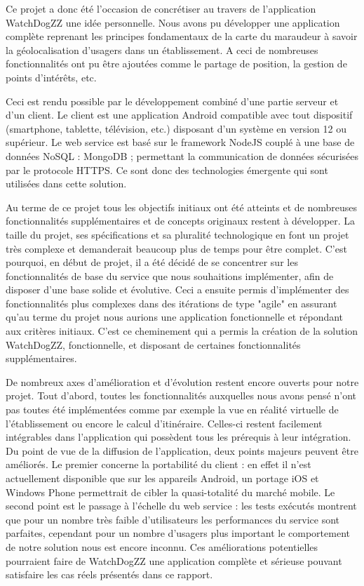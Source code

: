 
Ce projet a donc été l’occasion de concrétiser au travers de l’application WatchDogZZ une idée personnelle. Nous avons pu développer une application complète reprenant les principes fondamentaux de la carte du maraudeur à savoir la géolocalisation d’usagers dans un établissement. A ceci de nombreuses fonctionnalités ont pu être ajoutées comme le partage de position, la gestion de points d’intérêts, etc.

Ceci est rendu possible par le développement combiné d'une partie serveur et d'un client. Le client est une application Android compatible avec tout dispositif (smartphone, tablette, télévision, etc.) disposant d’un système en version 12 ou supérieur. Le web service est basé sur le framework NodeJS couplé à une base de données NoSQL : MongoDB ; permettant la communication de données sécurisées par le protocole HTTPS. Ce sont donc des technologies émergente qui sont utilisées dans cette solution.

Au terme de ce projet tous les objectifs initiaux ont été atteints et de nombreuses fonctionnalités supplémentaires et de concepts originaux restent à développer. La taille du projet, ses spécifications et sa pluralité technologique en font un projet très complexe et demanderait beaucoup plus de temps pour être complet.
C'est pourquoi, en début de projet, il a été décidé de se concentrer sur les fonctionnalités de base du service que nous souhaitions implémenter, afin de disposer d'une base solide et évolutive.
Ceci a ensuite permis d’implémenter des fonctionnalités plus complexes dans des itérations de type "agile" en assurant qu’au terme du projet nous aurions une application fonctionnelle et répondant aux critères initiaux.
C'est ce cheminement qui a permis la création de la solution WatchDogZZ, fonctionnelle, et disposant de certaines fonctionnalités supplémentaires.

De nombreux axes d’amélioration et d’évolution restent encore ouverts pour notre projet. Tout d’abord, toutes les fonctionnalités auxquelles nous avons pensé n’ont pas toutes été implémentées comme par exemple la vue en réalité virtuelle de l’établissement ou encore le calcul d’itinéraire. Celles-ci restent facilement intégrables dans l’application qui possèdent tous les prérequis à leur intégration.
Du point de vue de la diffusion de l'application, deux points majeurs peuvent être améliorés. Le premier concerne la portabilité du client : en effet il n’est actuellement disponible que sur les appareils Android, un portage iOS et Windows Phone permettrait de cibler la quasi-totalité du marché mobile. Le second point est le passage à l’échelle du web service : les tests exécutés montrent que pour un nombre très faible d’utilisateurs les performances du service sont parfaites, cependant pour un nombre d’usagers plus important le comportement de notre solution nous est encore inconnu. Ces améliorations potentielles pourraient faire de WatchDogZZ une application complète et sérieuse pouvant satisfaire les cas réels présentés dans ce rapport.
